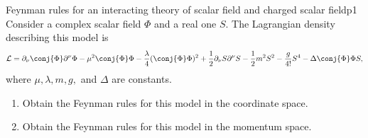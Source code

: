 \begin{problem}{Feynman rules for an interacting theory of scalar field and charged scalar field}{p1}
   Consider a complex scalar field \(\Phi\) and a real one \(S\). The Lagrangian density describing this model is
   \begin{equation*}
         \mathcal{L} = \partial_\nu \conj{\Phi} \partial^\nu \Phi - \mu^2 \conj{\Phi}\Phi - \frac{\lambda}{4} (\conj{\Phi}\Phi)^2 + \frac12 \partial_\nu S\partial^\nu S - \frac12 m^2 S^2 - \frac{g}{4!} S^4 - \Delta \conj{\Phi}\Phi S,
   \end{equation*}
   where \(\mu, \lambda, m, g,\) and \(\Delta\) are constants.
   \begin{enumerate}[label=(\alph*)]
       \item Obtain the Feynman rules for this model in the coordinate space.
       \item Obtain the Feynman rules for this model in the momentum space.
   \end{enumerate}
\end{problem}
